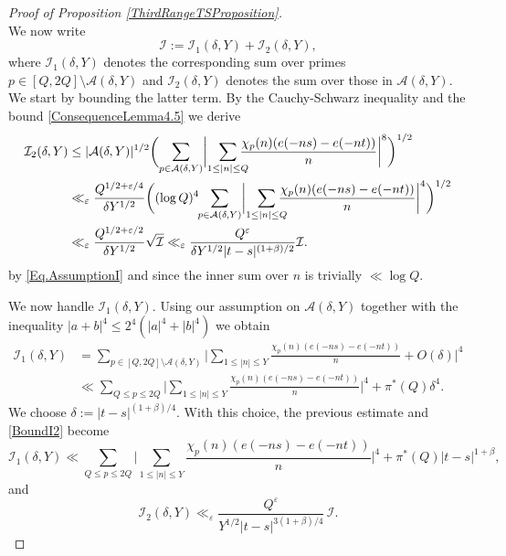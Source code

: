 \documentclass[10pt]{amsart}
\theoremstyle{plain}
\theoremstyle{definition}
\let\ep\varepsilon
\begin{document}
\begin{proof}[Proof of Proposition \ref{ThirdRangeTSProposition}]
\begin{equation}
\end{equation}
We now write\vspace*{-3pt}
\[
\mathcal{I}:= \mathcal{I}_1(\delta, Y)+\mathcal{I}_2 (\delta, Y),
\]
where $\mathcal{I}_1(\delta, Y)$ denotes the corresponding sum over primes $p\in [Q, 2Q]\setminus\mathcal{A}(\delta, Y)$ and $\mathcal{I}_2(\delta, Y)$ denotes the sum over those in $\mathcal{A}(\delta, Y)$. We start by bounding the latter term. By the Cauchy-Schwarz inequality and the bound \eqref{ConsequenceLemma4.5} we derive
\begin{equation}\label{BoundI2}
\begin{aligned}
\mathcal{I}_2(\delta, Y) & \leq |\mathcal{A}(\delta, Y)|^{1/2}\biggl(\sum_{p \in \mathcal{A}(\delta, Y)} \biggl|\sum_{1\leq |n|\leq Q}\hspace*{-3mm} \frac{\chi_p(n) (e(-ns)-e(-nt))}{n} \biggr|^8\biggr)^{1/2}\\
& \ll_{\ep} \frac{Q^{1/2+\ep/4}}{\delta Y^{1/2}} \biggl((\log Q)^4\hspace*{-1mm}\sum_{p \in \mathcal{A}(\delta,Y)} \biggl|\sum_{1\leq |n|\leq Q}\hspace*{-3mm} \frac{\chi_p(n) (e(-ns)-e(-nt))}{n} \biggr|^4\biggr)^{1/2}\\
& \ll_{\ep} \frac{Q^{1/2+\ep/2}}{\delta Y^{1/2}} \sqrt{\mathcal{I}}\ll_{\ep} \frac{Q^{\ep}}{\delta Y^{1/2} |t-s|^{(1+\beta)/2}} \mathcal{I}.
\end{aligned}
\end{equation}
by \eqref{Eq.AssumptionI} and since the inner sum over $n$ is trivially $\ll \log Q$.

We now handle $\mathcal{I}_1(\delta, Y)$. Using our assumption on $\mathcal{A}(\delta,Y)$ together with the inequality $|a+b|^{4} \leq 2^{4}(|a|^{4}+|b|^{4})$ we obtain
\begin{align*}
\mathcal{I}_1(\delta, Y)&= \sum_{p\in [Q, 2Q]\setminus\mathcal{A}(\delta,Y)} \biggl|\sum_{1\leq |n|\leq Y} \frac{\chi_p(n) (e(-ns)-e(-nt))}{n} +O(\delta) \biggr|^4\\
& \ll \sum_{Q\leq p\leq 2Q} \biggl|\sum_{1\leq |n|\leq Y} \frac{\chi_p(n) (e(-ns)-e(-nt))}{n} \biggr|^4 + \pi^{*}(Q)\delta^4.
\end{align*}
We choose $\delta:= |t-s|^{(1+\beta)/4}$. With this choice, the previous estimate and \eqref{BoundI2} become
\begin{equation}\label{Eq.SecondBoundI1}
\mathcal{I}_1(\delta, Y) \ll \sum_{Q\leq p\leq 2Q} \biggl|\sum_{1\leq |n|\leq Y} \frac{\chi_p(n) (e(-ns)-e(-nt))}{n} \biggr|^4 + \pi^{*}(Q)|t-s|^{1+\beta},
\end{equation}
and
\begin{equation}\label{Eq.SecondBoundI2}
\mathcal{I}_2(\delta, Y) \ll_{\ep} \frac{Q^{\ep}}{Y^{1/2} |t-s|^{3(1+\beta)/4}}\, \mathcal{I}.
\end{equation}


\end{proof}
\end{document}
